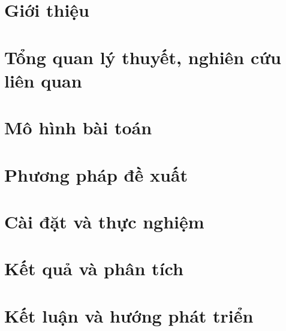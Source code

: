 \documentclass{template/thesis}
\begin{document}
\firstbeforepreface
\secondbeforepreface
\afterpreface

\chapter{Giới thiệu}
\label{c:intro}


\chapter{Tổng quan lý thuyết, nghiên cứu liên quan}
\label{c:cosolythuyet}



\chapter{Mô hình bài toán}
\label{c:mohinhbaitoan}


\chapter{Phương pháp đề xuất}
\label{c:phuongphapdexuat}


\chapter{Cài đặt và thực nghiệm}
\label{c:caidatvathucnghiem}


\chapter{Kết quả và phân tích}
\label{c:ketquavaphantich}


\chapter{Kết luận và hướng phát triển}
\label{c:ketluanvahuongphattrien}


\begingroup
\setlength{\emergencystretch}{8em}
\justifying
\nocite{*}
\printbibliography[title=Tài liệu tham khảo]
\endgroup
{}
\end{document}
